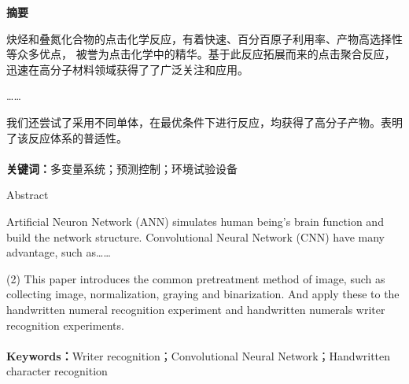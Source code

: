 \documentclass[a4paper]{article}
\begin{document}
\setcounter{page}{1}
\begin{center}
 \bfseries
 摘\quad 要
\end{center}
\thispagestyle{plain}
\begin{spacing}{1.5}
炔烃和叠氮化合物的点击化学反应，有着快速、百分百原子利用率、产物高选择性等众多优点，
 被誉为点击化学中的精华。基于此反应拓展而来的点击聚合反应，迅速在高分子材料领域获得了了广泛关注和应用。

……

我们还尝试了采用不同单体，在最优条件下进行反应，均获得了高分子产物。表明了该反应体系的普适性。\\
\ \\
\textbf{关键词：}多变量系统；预测控制；环境试验设备
\end{spacing}
\pagebreak[4]
\thispagestyle{plain}

\begin{center}
 Abstract
\end{center}
\begin{spacing}{1.5}
 Artificial Neuron Network (ANN) simulates human being's brain function and build the network structure. Convolutional Neural Network (CNN) have many advantage, such as……

    (2) This paper introduces the common pretreatment method of image, such as collecting image, normalization, graying and binarization. And apply these to the handwritten numeral recognition experiment and handwritten numerals writer recognition experiments.
\\
\ 
\\
 \textbf{Keywords：}Writer recognition；Convolutional Neural Network；Handwritten character recognition
\end{spacing}
\pagebreak[4]



\thispagestyle{plain}
\begin{spacing}{1.5}
\tableofcontents
\end{spacing}
\thispagestyle{plain}
\pagebreak[4]
\end{document}
